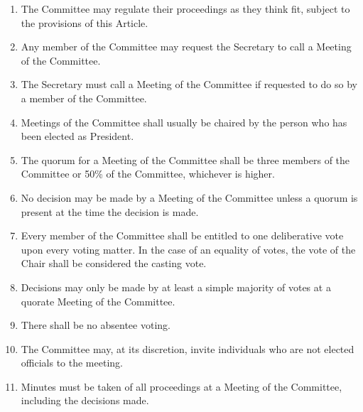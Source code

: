 \documentclass[12pt]{constitution}
\begin{document}

\label{article:meetings-committee}
\begin{enumerate}
    \item The Committee may regulate their proceedings as they think fit, subject to the provisions of this Article.
    \item Any member of the Committee may request the Secretary to call a Meeting of the Committee.
    \item The Secretary must call a Meeting of the Committee if requested to do so by a member of the Committee.
    \item Meetings of the Committee shall usually be chaired by the person who has been elected as President.
    \item The quorum for a Meeting of the Committee shall be three members of the Committee or 50\% of the Committee, whichever is higher.
    \item No decision may be made by a Meeting of the Committee unless a quorum is present at the time the decision is made.
    \item Every member of the Committee shall be entitled to one deliberative vote upon every voting matter. In the case of an equality of votes, the vote of the Chair shall be considered the casting vote.
    \item Decisions may only be made by at least a simple majority of votes at a quorate Meeting of the Committee.
    \item There shall be no absentee voting.
    \item The Committee may, at its discretion, invite individuals who are not elected officials to the meeting.
    \item Minutes must be taken of all proceedings at a Meeting of the Committee, including the decisions made.
\end{enumerate}


\label{article:appointment-committee}
\end{document}
